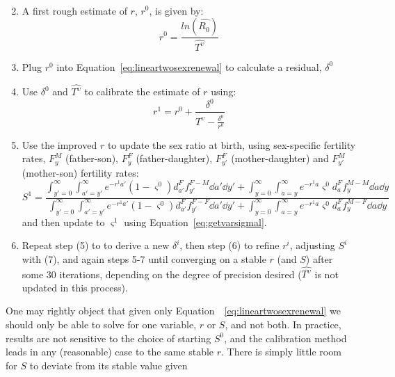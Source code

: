 \begin{enumerate}
\begin{equation}
\begin{split}
 \end{split}
 \end{equation}
  \item A first rough estimate of $r$, $r^0$, is given by:
   \begin{equation}
   r^0 = \frac{ln(\widehat{R_0})}{\widehat{T^\upsilon}}
   \end{equation}
  \item Plug $r^0$ into Equation~\eqref{eq:lineartwosexrenewal} to calculate a
  residual, $\delta^0$
  \item Use $\delta^0$ and $\widehat{T^\upsilon}$ to calibrate the estimate of $r$
  using:
  \begin{equation}
  r^{1} = r^0 + \frac{\delta^0}{\widehat{T^\upsilon} - \frac{\delta^0}{r^0}}
  \end{equation}
  \item  Use the improved $r$ to update the sex ratio at birth, using
  sex-specific fertility rates, $F_y^M$ (father-son), $F_y^F$
  (father-daughter), $F_{y'}^F$ (mother-daughter) and $F_{y'}^M$ (mother-son)
  fertility rates:
  \begin{equation}
  S^1 = \frac{ \int _{y'=0}^\infty \int _{a'=y'}^\infty e^{-r^1a'}
                      (1-\varsigma^0)d_{a'}^F f_{y'}^{F-M} \dd a' \dd y' + \int
                      _{y=0}^\infty \int _{a=y}^\infty e^{-r^1a}
                      \varsigma^0 d_{a}^F f_{y}^{M-M} \dd a \dd y}{\int
                      _{y'=0}^\infty \int _{a'=y'}^\infty e^{-r^1a'}
                      (1-\varsigma^0)d_{a'}^F f_{y'}^{F-F} \dd a' \dd y' + \int
                      _{y=0}^\infty \int _{a=y}^\infty e^{-r^1a} \varsigma^0
                      d_{a}^F f_{y}^{M-F} \dd a \dd y}
  \end{equation}
  and then update to $\varsigma^1$ using Equation~\eqref{eq:getvarsigmal}.
  \item Repeat step (5) to to derive a new $\delta^i$, then step (6) to refine
  $r^i$, adjusting $S^i$ with (7), and again steps 5-7 until converging on a
  stable $r$ (and $S$) after some 30 iterations, depending on the degree of
  precision desired ($\widehat{T^\upsilon}$ is not updated in this process).
\end{enumerate}
  One may rightly object that given only
  Equation~~\eqref{eq:lineartwosexrenewal} we should only be able to
  solve for one variable, $r$ or $S$, and not both. In practice, results are
  not sensitive to the choice of starting $S^0$, and the
  calibration method leads in any (reasonable) case to the same stable $r$.
  There is simply little room for $S$ to deviate from its stable value given 
